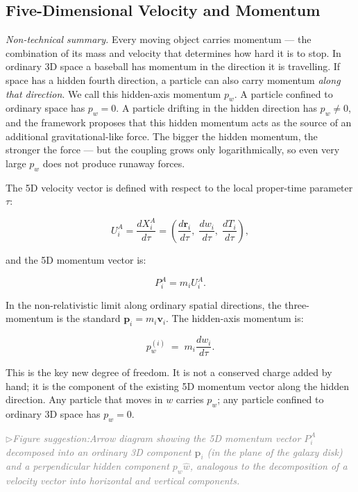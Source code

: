 \documentclass[11pt,a4paper]{article}
\newcommand{\pw}{p_w}                        %
\newcommand{\UA}{U^A}                        %
\newcommand{\XA}{X^A}                        %
\newcommand{\PA}{P^A}                        %
\newcommand{\figsuggest}[1]{%
  \medskip
  \noindent\hspace{0pt}\textcolor{gray}{\small\itshape
    $\triangleright$\;Figure suggestion:\enspace #1}%
  \medskip}
\begin{document}
\subsection{Five-Dimensional Velocity and Momentum}\label{sec:momentum}

\textit{Non-technical summary.}\enspace
Every moving object carries momentum --- the combination of its mass and
velocity that determines how hard it is to stop.  In ordinary 3D space a
baseball has momentum in the direction it is travelling.  If space has a
hidden fourth direction, a particle can also carry momentum \emph{along that
direction}.  We call this hidden-axis momentum $\pw$.  A particle confined
to ordinary space has $\pw = 0$.  A particle drifting in the hidden direction
has $\pw \neq 0$, and the framework proposes that this hidden momentum acts
as the source of an additional gravitational-like force.  The bigger the
hidden momentum, the stronger the force --- but the coupling grows only
logarithmically, so even very large $\pw$ does not produce runaway forces.

The 5D velocity vector is defined with respect to the local proper-time
parameter $\tau$:

\[
  \UA_i = \frac{d\XA_i}{d\tau}
  = \left(\frac{d\mathbf{r}_i}{d\tau},\;\frac{dw_i}{d\tau},\;\frac{dT_i}{d\tau}\right) ,
\]

and the 5D momentum vector is:

\[
  \PA_i = m_i \UA_i .
\]

In the non-relativistic limit along ordinary spatial directions, the
three-momentum is the standard $\mathbf{p}_i = m_i \mathbf{v}_i$.  The
hidden-axis momentum is:

\begin{keybox}
\[
  \pw^{(i)} \;=\; m_i \frac{dw_i}{d\tau} .
\]
\end{keybox}

\noindent
This is the key new degree of freedom.  It is not a conserved charge added
by hand; it is the component of the existing 5D momentum vector along the
hidden direction.  Any particle that moves in $w$ carries $\pw$; any particle
confined to ordinary 3D space has $\pw = 0$.

\figsuggest{Arrow diagram showing the 5D momentum vector $\PA_i$ decomposed
into an ordinary 3D component $\mathbf{p}_i$ (in the plane of the galaxy disk)
and a perpendicular hidden component $\pw\hat{w}$, analogous to the
decomposition of a velocity vector into horizontal and vertical components.}
\end{document}
